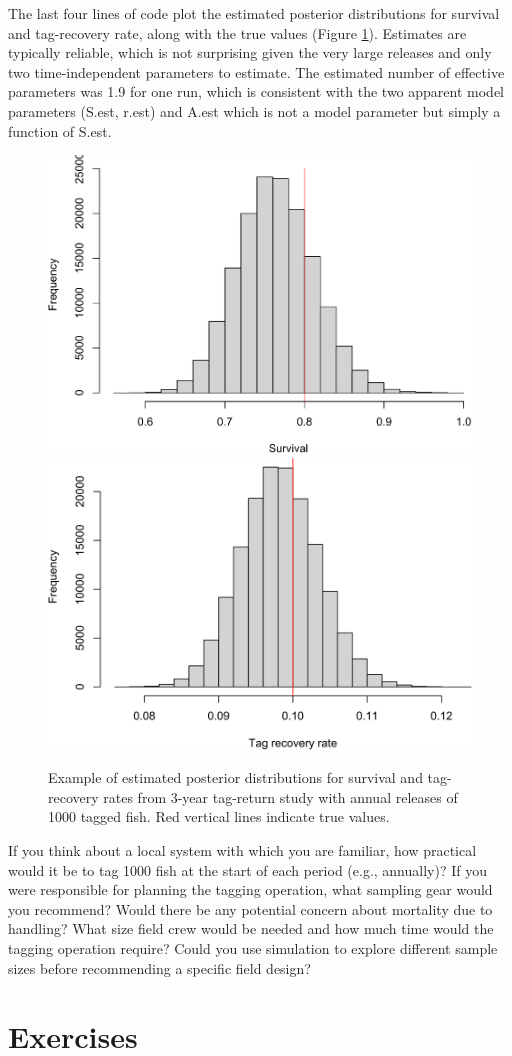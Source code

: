 \documentclass[
]{krantz}
\begin{document}
The last four lines of code plot the estimated posterior distributions for survival and tag-recovery rate, along with the true values (Figure \ref{fig:TagRetPlot}). Estimates are typically reliable, which is not surprising given the very large releases and only two time-independent parameters to estimate. The estimated number of effective parameters was 1.9 for one run, which is consistent with the two apparent model parameters (S.est, r.est) and A.est which is not a model parameter but simply a function of S.est.

\begin{figure}
\includegraphics[width=0.45\linewidth]{bookdown_files/figure-latex/TagRetPlot-1} \includegraphics[width=0.45\linewidth]{bookdown_files/figure-latex/TagRetPlot-2} \caption{Example of estimated posterior distributions for survival and tag-recovery rates from 3-year tag-return study with annual releases of 1000 tagged fish. Red vertical lines indicate true values.}\label{fig:TagRetPlot}
\end{figure}

If you think about a local system with which you are familiar, how practical would it be to tag 1000 fish at the start of each period (e.g., annually)? If you were responsible for planning the tagging operation, what sampling gear would you recommend? Would there be any potential concern about mortality due to handling? What size field crew would be needed and how much time would the tagging operation require? Could you use simulation to explore different sample sizes before recommending a specific field design?

\hypertarget{exercises-3}{%
\section{Exercises}\label{exercises-3}}
\end{document}
